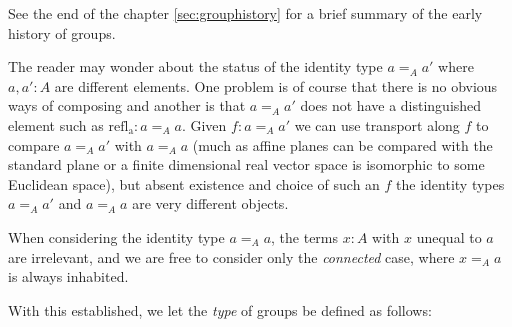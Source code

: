 See the end of the chapter \ref{sec:grouphistory} for a brief summary of the early history of groups.  
\begin{remark}
  The reader may wonder about the status of the identity type $a=_Aa'$ where $a,a':A$ are different elements.  One problem is of course that there is no obvious ways of composing and another is that $a=_Aa'$ does not have a distinguished element such as $\mathrm{refl{}_a}:a=_Aa$.
Given $f:a=_Aa'$ we can use transport along $f$ to compare $a=_Aa'$ with $a=_Aa$ (much as affine planes can be compared with the standard plane or a finite dimensional real vector space is isomorphic to some Euclidean space), but absent existence and choice of such an $f$ the identity types $a=_Aa'$ and $a=_Aa$ are very different objects.
\end{remark}


\begin{remark}
  When considering the identity type $a=_Aa$, the terms $x:A$ with $x$ unequal to $a$ are irrelevant, and we are free to consider only the {\em connected} case, \ie where $x=_Aa$ is always inhabited.
\end{remark}


With this established, we let the {\em type} of groups be defined as follows:

